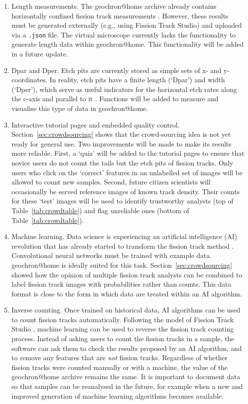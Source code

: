 \documentclass{article}
\begin{document}
\begin{enumerate}
\item Length measurements. The geochron@home archive already contains
  horizontally confined fission track measurements \citep{tamer2025}.
  However, these results must be generated externally (e.g., using
  Fission Track Studio) and uploaded via a \texttt{.json} file.  The
  virtual microscope currently lacks the functionality to generate
  length data within geochron@home. This functionality will be added
  in a future update.
\item Dpar and Dper. Etch pits are currently stored as simple sets of
  x- and y-coordinates.  In reality, etch pits have a finite length
  (`Dpar') and width (`Dper'), which serve as useful indicators for
  the horizontal etch rates along the c-axis and parallel to it
  \citep{donelick1993}. Functions will be added to measure and
  visualise this type of data in geochron@home.
\item Interactive tutorial pages and embedded quality
  control. Section~\ref{sec:crowdsourcing} shows that the
  crowd-sourcing idea is not yet ready for general use. Two
  improvements will be made to make its results more reliable. First,
  a `quiz' will be added to the tutorial pages to ensure that novice
  users do not count the tails but the etch pits of fission
  tracks. Only users who click on the `correct' features in an
  unlabelled set of images will be allowed to count new
  samples. Second, future citizen scientists will occasionally be
  served reference images of known track density. Their counts for
  these `test' images will be used to identify trustworthy analysts
  (top of Table~\ref{tab:crowdtable}) and flag unreliable ones (bottom
  of Table~\ref{tab:crowdtable}).
\item Machine learning. Data science is experiencing an artificial
  intelligence (AI) revolution that has already started to transform
  the fission track method \citep{nachtergaele2020}.  Convolutional
  neural networks must be trained with example data. geochron@home is
  ideally suited for this task. Section~\ref{sec:crowdsourcing} showed
  how the opinion of multiple fission track analysts can be combined
  to label fission track images with probabilities rather than
  counts. This data format is close to the form in which data are
  treated within an AI algorithm.
\item Inverse counting. Once trained on historical data, AI algorithms
  can be used to count fission tracks automatically. Following the
  model of Fission Track Studio \citep{gleadow2009, gleadow2019},
  machine learning can be used to reverse the fission track counting
  process. Instead of asking users to count the fission tracks in a
  sample, the software can ask them to check the results proposed by
  an AI algorithm, and to remove any features that are \emph{not}
  fission tracks.  Regardless of whether fission tracks were counted
  manually or with a machine, the value of the geochron@home archive
  remains the same. It is important to document data so that samples
  can be reanalysed in the future, for example when a new and improved
  generation of machine learning algorithms becomes available.
\end{enumerate}
\end{document}

